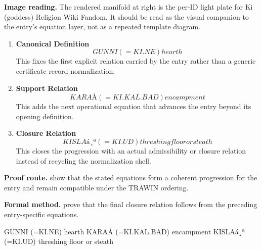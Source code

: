 \begin{samepage}
\noindent\begin{minipage}[t]{0.45\linewidth}
\vspace{0pt}
\raggedright
\scriptsize\textbf{Image reading.} The rendered manifold at right is the per-ID light plate for Ki (goddess) Religion Wiki Fandom. It should be read as the visual companion to the entry's equation layer, not as a repeated template diagram.\par
\end{minipage}\hfill
\begin{minipage}[t]{0.53\linewidth}
\vspace*{-0.10in}
\raggedright
{}
\end{minipage}
\end{samepage}

\clearpage


\begin{enumerate}[leftmargin=1.6em,itemsep=9pt,topsep=6pt]
\item \textbf{Canonical Definition}
\[
GUNNI (=KI.NE) hearth
\]
This fixes the first explicit relation carried by the entry rather than a generic certificate record normalization.

\item \textbf{Support Relation}
\[
KARAÅ (=KI.KAL.BAD) encampment
\]
This adds the next operational equation that advances the entry beyond its opening definition.

\item \textbf{Closure Relation}
\[
KISLAá¸ª (=KI.UD) threshing floor or steath
\]
This closes the progression with an actual admissibility or closure relation instead of recycling the normalization shell.
\end{enumerate}

\textbf{Proof route.} show that the stated equations form a coherent progression for the entry and remain compatible under the TRAWIN ordering.

\textbf{Formal method.} prove that the final closure relation follows from the preceding entry-specific equations.

\medskip
{}

\begin{tzpsnapshot}
\end{tzpsnapshot}

\tzpequationlinks
  {GUNNI (=KI.NE) hearth}
  {KARAÅ (=KI.KAL.BAD) encampment}
  {KISLAá¸ª (=KI.UD) threshing floor or steath}
